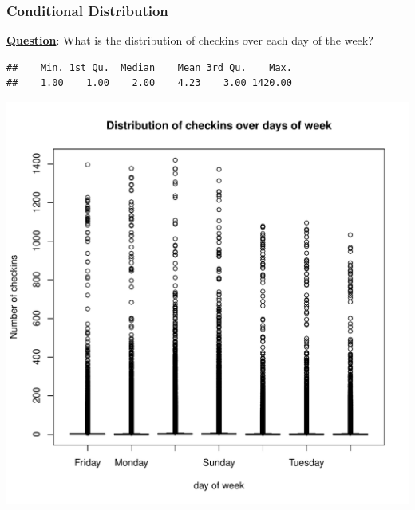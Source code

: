 \subsubsection{Conditional Distribution}
\noindent \textbf{\underline{Question}}: What is the distribution of checkins over each day of the week?
\begin{knitrout}
\color{fgcolor}\begin{kframe}
\begin{alltt}
\hlopt{$}
\end{alltt}
\begin{verbatim}
##    Min. 1st Qu.  Median    Mean 3rd Qu.    Max. 
##    1.00    1.00    2.00    4.23    3.00 1420.00
\end{verbatim}
\begin{alltt}
\hlopt{$} \hlopt{~} \hlopt{$}
         \hlstd{=} \hlstd{,}
         \hlstd{=} \hlstd{,} \hlstd{=} \hlstd{)}
\end{alltt}
\end{kframe}
\includegraphics[width=\maxwidth]{figure/checkinsOverWeek-1} 
\begin{kframe}\begin{alltt}
\end{alltt}
\end{kframe}
\end{knitrout}

